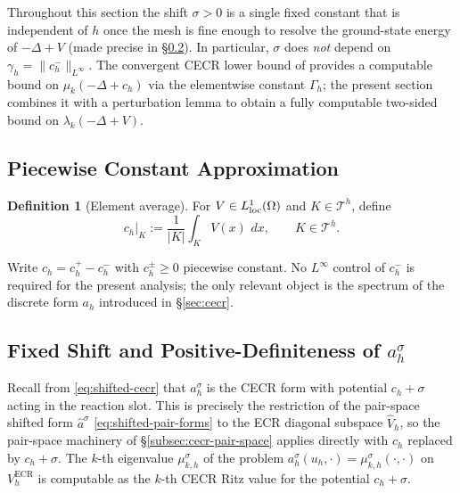 \documentclass[11pt]{article}
\theoremstyle{plain}
\theoremstyle{definition}
\newtheorem{definition}{Definition}
\theoremstyle{remark}
\newcommand{\dx}{\,dx}
\newcommand{\ECR}{\mathrm{ECR}}
\begin{document}
Throughout this section the shift $\sigma>0$ is a single fixed constant
that is independent of $h$ once the mesh is fine enough to resolve the
ground-state energy of $-\Delta+V$ (made precise in
\S\ref{subsec:fixed-shift}). In particular, $\sigma$ does \emph{not}
depend on $\gamma_h=\|c_h^-\|_{L^\infty}$. The convergent CECR
lower bound of  provides a computable
bound on $\mu_k(-\Delta+c_h)$ via the elementwise constant $\Gamma_h$;
the present section combines it with a perturbation lemma
to obtain a fully computable two-sided bound on $\lambda_k(-\Delta+V)$.

\subsection{Piecewise Constant Approximation}
\label{subsec:pc-approx}

\begin{definition}[Element average]
\label{def:element-average}
For $V \in L^1_{\rm loc}(\Omega)$ and $K \in \mathcal{T}^h$, define
\begin{equation}
\label{eq:element-average}
  c_h\big|_K := \frac{1}{|K|} \int_K V(x)\,\dx,
  \qquad K \in \mathcal{T}^h.
\end{equation}
\end{definition}
Write $c_h = c_h^+ - c_h^-$ with $c_h^\pm\ge 0$ piecewise constant.
No $L^\infty$ control of $c_h^-$ is required for the present analysis;
the only relevant object is the spectrum of the discrete form
$a_h$ introduced in \S\ref{sec:cecr}.

\subsection{Fixed Shift and Positive-Definiteness of \texorpdfstring{$a_h^\sigma$}{a\_h\textasciicircum sigma}}
\label{subsec:fixed-shift}

Recall from \eqref{eq:shifted-cecr} that $a_h^\sigma$ is the CECR
form with potential $c_h+\sigma$ acting in the reaction slot.  This is
precisely the restriction of the
pair-space shifted form $\widehat a^\sigma$
\eqref{eq:shifted-pair-forms} to the ECR diagonal subspace
$\widehat V_h$, so the pair-space machinery of
\S\ref{subsec:cecr-pair-space} applies directly with $c_h$
replaced by $c_h+\sigma$.  The $k$-th eigenvalue
$\mu_{k,h}^\sigma$ of the problem
$a_h^\sigma(u_h,\cdot)=\mu_{k,h}^\sigma(\cdot,\cdot)$ on
$V_h^{\ECR}$ is computable as the $k$-th CECR Ritz value for the
potential $c_h+\sigma$.
\end{document}
